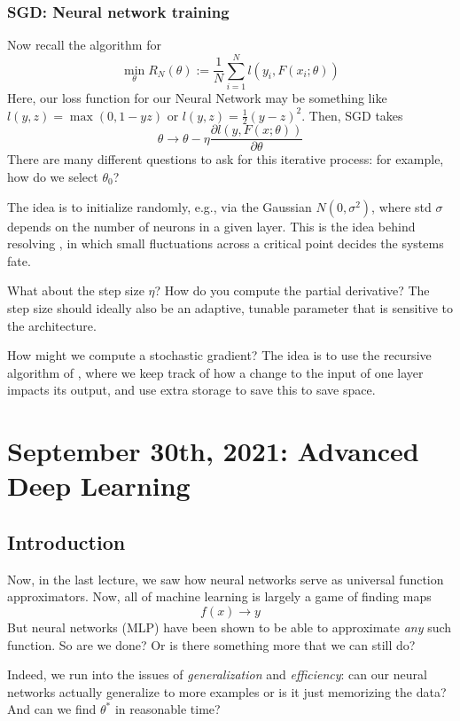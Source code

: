 \documentclass[11pt]{scrartcl}
\begin{document}
\subsubsection{SGD: Neural network training}
Now recall the algorithm for  
$$\min_{\theta} R_{N}(\theta) := \frac{1}{N}\sum_{i=1}^{N}l(y_i, F(x_i;\theta))$$
Here, our loss function for our Neural Network may be something like $l(y,z)=\max(0,1-yz)$ or $l(y,z)=\frac{1}{2}(y-z)^2$. Then, SGD takes $$\theta \to \theta-\eta\frac{\partial{l(y,F(x;\theta))}}{\partial\theta}$$
There are many different questions to ask for this iterative process: for example, how do we select $\theta_0$? 

The idea is to initialize randomly, e.g., via the Gaussian $N(0, \sigma^2)$, where std $\sigma$ depends on the number of neurons in a given layer. This is the idea behind resolving , in which small fluctuations across a critical point decides the systems fate.

What about the step size $\eta$? How do you compute the partial derivative? The step size should ideally also be an adaptive, tunable parameter that is sensitive to the architecture.

How might we compute a stochastic gradient? The idea is to use the recursive algorithm of , where we keep track of how a change to the input of one layer impacts its output, and use extra storage to save this to save space. 
\newpage


\section{September 30th, 2021: Advanced Deep Learning}

\subsection{Introduction}
Now, in the last lecture, we saw how neural networks serve as universal function approximators. Now, all of machine learning is largely a game of finding maps $$f(x) \to y$$
But neural networks (MLP) have been shown to be able to approximate \textit{any} such function. So are we done? Or is there something more that we can still do? 

Indeed, we run into the issues of \textit{generalization} and \textit{efficiency}: can our neural networks actually generalize to more examples or is it just memorizing the data? And can we find $\theta^*$ in reasonable time? 
\end{document}
